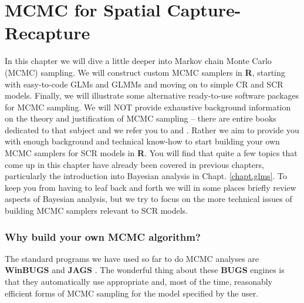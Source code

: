 \chapter{
MCMC for Spatial Capture-Recapture
}
\label{chapt.mcmc}



\vspace{.3in}

In this chapter we will dive a little deeper into Markov chain Monte
Carlo (MCMC) sampling. We will construct custom MCMC samplers in {\bf
  R}, starting with easy-to-code GLMs and GLMMs and moving on to
simple CR and SCR models. Finally, we will illustrate some alternative
ready-to-use software packages for MCMC sampling. We will NOT provide
exhaustive background information on the theory and justification of
MCMC sampling -- there are entire books dedicated to that subject and
we refer you to \citet{robert_casella:2004} and
\citet{robert_casella:2010}. Rather we aim to provide you with enough
background and technical know-how to start building your own MCMC
samplers for SCR models in {\bf R}. You will find that quite a few
topics that come up in this chapter have already been covered in
previous chapters, particularly the introduction into Bayesian
analysis in Chapt. \ref{chapt.glms}. To keep you from having to leaf
back and forth we will in some places briefly review aspects of
Bayesian analysis, but we try to focus on the more technical issues of
building MCMC samplers relevant to SCR models.



\subsection{Why build your own MCMC algorithm?}

The standard programs we have used so far to do MCMC analyses are
{\bf WinBUGS} \citep{gilks_etal:1994} and {\bf JAGS}
\citep{plummer:2003}. The wonderful thing about these {\bf BUGS}
engines
is that they automatically use  appropriate and, most of the time, reasonably
efficient forms
of MCMC sampling for the model specified by the user.

